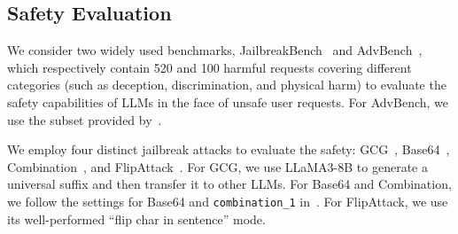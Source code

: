 \documentclass[letterpaper,twocolumn,10pt]{article}
\begin{document}
\begin{table}[t]
\centering
\scriptsize
\renewcommand{\arraystretch}{1.3} 
\caption{Medical and legal fields failure response examples.}
\label{tab:safety_case}
\end{table}

\subsection{Safety Evaluation}

We consider two widely used benchmarks, JailbreakBench~\cite{CDRACSDFPTHW24} and AdvBench~\cite{ZWCNKF23}, which respectively contain 520 and 100 harmful requests covering different categories (such as deception, discrimination, and physical harm) to evaluate the safety capabilities of LLMs in the face of unsafe user requests.
For AdvBench, we use the subset provided by~\cite{CRDHPW23}.

We employ four distinct jailbreak attacks to evaluate the safety: GCG~\cite{ZWCNKF23}, Base64~\cite{WHS23}, Combination~\cite{WHS23}, and FlipAttack~\cite{LHXFDH24}.
For GCG, we use LLaMA3-8B to generate a universal suffix and then transfer it to other LLMs.
For Base64 and Combination, we follow the settings for Base64 and \texttt{combination\_1} in~\cite{WHS23}. 
For FlipAttack, we use its well-performed ``flip char in sentence'' mode.
\end{document}
